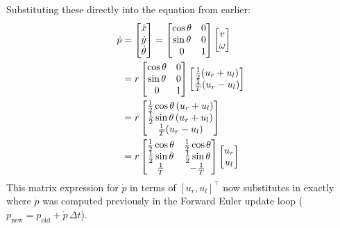 \begin{enumerate}[label=\textbf{(\alph*)}]
    Substituting these directly into the equation from earlier:
    \begin{align}
        \dot{p} &= \begin{bmatrix} \dot{x} \\ \dot{y} \\ \dot{\theta} \end{bmatrix} = \begin{bmatrix} \cos\theta & 0 \\ \sin\theta & 0 \\ 0 & 1 \end{bmatrix} \begin{bmatrix} v \\ \omega \end{bmatrix} \notag \\
        &= r \begin{bmatrix} \cos\theta & 0 \\ \sin\theta & 0 \\ 0 & 1 \end{bmatrix} \begin{bmatrix} \frac{1}{2}(u_r + u_l) \\ \frac{1}{T}(u_r - u_l) \end{bmatrix} \notag \\
        &= r \begin{bmatrix} \frac{1}{2}\cos\theta\,(u_r + u_l) \\ \frac{1}{2}\sin\theta\,(u_r + u_l) \\ \frac{1}{T}(u_r - u_l) \end{bmatrix} \notag \\
        &= r \begin{bmatrix} \frac{1}{2}\cos\theta & \frac{1}{2}\cos\theta \\ \frac{1}{2}\sin\theta & \frac{1}{2}\sin\theta \\ \frac{1}{T} & -\frac{1}{T} \end{bmatrix} \begin{bmatrix} u_r \\ u_l \end{bmatrix}
    \end{align}
    This matrix expression for $\dot{p}$ in terms of $[u_r, u_l]^\top$ now substitutes in exactly where $\dot{p}$ was computed previously in the Forward Euler update loop ($p_{\text{new}} = p_{\text{old}} + \dot{p}\,\Delta t$).
\end{enumerate}

